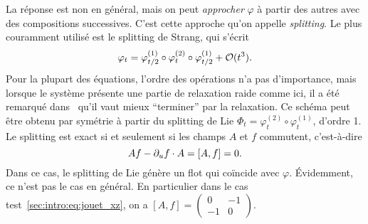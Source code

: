 La réponse est non en général, mais on peut \textit{approcher} $\varphi$ à partir des autres avec des compositions successives. C'est cette approche qu'on appelle \textit{splitting}. Le plus couramment utilisé est le splitting de Strang, qui s'écrit 
\begin{equation*}
    \varphi_t = \varphi^{(1)}_{t/2} \circ \varphi^{(2)}_{t} \circ \varphi^{(1)}_{t/2} + \mathcal{O}(t^3) .
\end{equation*}
Pour la plupart des équations, l'ordre des opérations n'a pas d'importance, mais lorsque le système présente une partie de relaxation raide comme ici, il a été remarqué dans~\cite{sportisse.2000.analysis,descombes.2004.operator} qu'il vaut mieux \enquote{terminer} par la relaxation. 
Ce schéma peut être obtenu par symétrie à partir du splitting de Lie $\Phi_t = \varphi^{(2)}_{t} \circ \varphi^{(1)}_{t}$, d'ordre 1. 
Le splitting est exact si et seulement si les champs $A$ et $f$ commutent, c'est-à-dire 
\begin{equation*}
    Af - \partial_u f \cdot A = [A,f] = 0 .
\end{equation*}
Dans ce cas, le splitting de Lie génère un flot qui coïncide avec $\varphi$. Évidemment, ce n'est pas le cas en général. En particulier dans le cas test~\eqref{sec:intro:eq:jouet_xz}, on a $[A,f] = \begin{pmatrix} 0 & -1 \\ -1 & 0 \end{pmatrix}$. 
